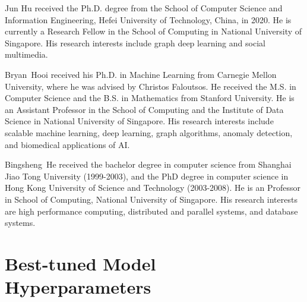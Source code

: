 \documentclass[lettersize,journal]{IEEEtran}
\begin{document}










\begin{IEEEbiography}{Jun Hu} 
received the Ph.D. degree from the School of Computer Science and Information Engineering, Hefei University of Technology, China, in 2020. He is currently a Research Fellow in the School of Computing in National University of Singapore. His research interests include graph deep learning and social multimedia.
\end{IEEEbiography}


\begin{IEEEbiography}{Bryan~Hooi} 
received his Ph.D. in Machine Learning from Carnegie Mellon University, where he was advised by Christos Faloutsos. He received the M.S. in Computer Science and the B.S. in Mathematics from Stanford University. He is an Assistant Professor in the School of Computing and the Institute of Data Science in National University of Singapore. His research interests include scalable machine learning, deep learning, graph algorithms, anomaly detection, and biomedical applications of AI.
\end{IEEEbiography}


\begin{IEEEbiography}{Bingsheng~He} received the bachelor degree in computer science from Shanghai Jiao Tong University (1999-2003), and the PhD degree in computer science in Hong Kong University of Science and Technology (2003-2008). He is an Professor in School of Computing, National University of Singapore. His research interests are high performance computing, distributed and parallel systems, and database systems.
\end{IEEEbiography}






\vfill


\clearpage
\newpage



\appendices
\section{Best-tuned Model Hyperparameters}\label{app:params}
\end{document}
